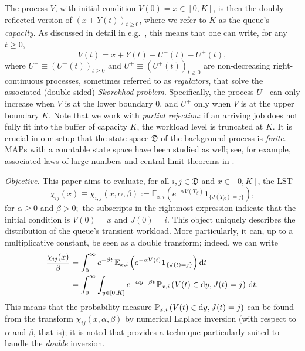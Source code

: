 \documentclass[reqno,12pt]{amsart}
\newcommand{\e}{\mathbb{E}}
\newcommand{\bs}{\boldsymbol}
\newcommand{\defD}{{\mathfrak D}}
\begin{document}
The process $V$, with initial condition $V(0)=x\in[0,K]$, is then the doubly-reflected version of $(x+Y(t))_{t\geqslant 0}$, where we refer to $K$ as the queue's {\it capacity}. As discussed in detail in e.g.\ \cite[\S 1]{AAGP}, this means that one can write, for any $t\geqslant 0$, 
\begin{equation}\label{eq: regu} 
    V(t) = x + Y(t) + U^-(t) - U^+(t),
\end{equation}
where $U^-\equiv (U^-(t))_{t\geqslant 0}$ and $U^+\equiv (U^+(t))_{t\geqslant 0}$ are non-decreasing right-continuous processes, sometimes referred to as {\it regulators}, that solve the associated (double sided) {\it Skorokhod problem}. Specifically,
the process $U^-$ can only increase when $V$ is at the lower boundary 0, and $U^+$ only
when $V$ is at the upper boundary $K$.
Note that we work with \emph{partial rejection}: if an arriving job does not fully fit into the buffer of capacity $K$, the workload level is truncated at $K$. It is crucial in our setup that the state space $\defD$ of the background process is \emph{finite}. MAPs with a countable state space have been studied as well; see, for example, associated laws of large numbers and central limit theorems in \cite{KR}.



\medskip

{\it Objective.} This paper aims to evaluate, for all $i,j\in\defD $ and $x\in[0, K]$, the LST
\begin{equation}\label{eq: def chi_ij}
    \chi_{ij}(x) \equiv \chi_{i,j}(x,\alpha,\beta) := \e_{x,i}\left( e^{-\alpha V(T_{\beta})} \bs{1}_{\{J(T_{\beta})=j\}} \right),
\end{equation}
for $\alpha\geqslant 0$ and $\beta > 0;$ the subscripts in the rightmost expression indicate that the initial condition is $V(0)=x$ and $J(0)=i.$ This object uniquely describes the distribution of the queue's transient workload. More particularly, it can, up to a multiplicative constant, be seen as a double transform; indeed, we can write
\begin{align*}
    \frac{\chi_{ij}(x)}{\beta} &= \int_0^\infty e^{-{\beta} t} \,\e_{x,i}\left( e^{-\alpha V(t)} \bs{1}_{\{J(t)=j\}} \right){\rm d}t\\&= \int_{0}^\infty \int_{y\in[0,K]} e^{-\alpha y-\beta t} \,{\mathbb P}_{x,i}\left( V(t)\in {\rm d}y, J(t)=j \right)\,{\rm d}t .
\end{align*}
This means that the probability measure ${\mathbb P}_{x,i}\left( V(t)\in {\rm d}y, J(t)=j \right)$ can be found  \cite{AW,dI} from the transform $\chi_{ij}(x,\alpha,\beta)$ by numerical Laplace inversion (with respect to $\alpha$ and $\beta$, that is); it is noted that \cite{dI} provides a technique particularly suited to handle the {\it double} inversion. 
\end{document}
